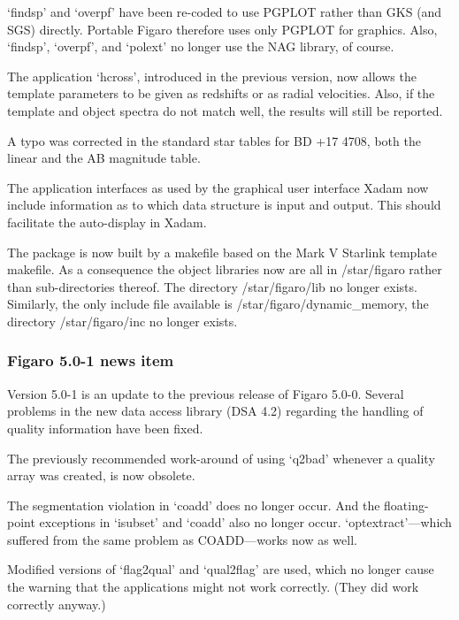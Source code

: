 \documentclass[11pt,twoside]{article}
\newcommand{\latorhtm}[2]{#1}
\newcommand{\latorhtm}[2]{#2}
\begin{document}
   `findsp' and `overpf' have been re-coded to use PGPLOT rather than
   GKS (and SGS) directly. Portable Figaro therefore uses only PGPLOT for
   graphics. Also, `findsp', `overpf', and `polext' no longer use
   the NAG library, of course.


   The application `hcross', introduced in the previous version, now
   allows the template parameters to be given as redshifts or as radial
   velocities. Also, if the template and object spectra do not match
   well, the results will still be reported.


   A typo was corrected in the standard star tables for BD +17 4708, both
   the linear and the AB magnitude table.

   The application interfaces as used by the graphical user interface
   Xadam now include information as to which data structure is input and
   output. This should facilitate the auto-display in Xadam.

   The package is now built by a makefile based on the Mark V Starlink
   template makefile. As a consequence the object libraries now are all
   in /star/figaro rather than sub-directories thereof. The directory
   /star/figaro/lib no longer exists. Similarly, the only include file
   available is /star/figaro/dynamic\_memory, the directory
   /star/figaro/inc no longer exists.


\subsubsection{\label{news501}Figaro 5.0-1 news item}

   Version 5.0-1 is an update to the previous release of Figaro
   5.0-0. Several problems in the new data access library (DSA 4.2)
   regarding the handling of quality information have been fixed.

   The previously recommended work-around of using `q2bad' whenever a
   quality array was created, is now obsolete.

   The segmentation violation in `coadd' does no longer occur. And the
   floating-point exceptions in `isubset' and `coadd' also no longer
   occur. `optextract'\latorhtm{---}{-}which suffered from the same
   problem as COADD\latorhtm{---}{-}works now as well.

   Modified versions of `flag2qual' and `qual2flag' are used, which no
   longer cause the warning that the applications might not work
   correctly. (They did work correctly anyway.)
\end{document}
